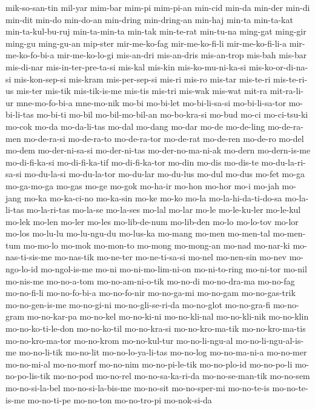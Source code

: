 {mik-so-san-tin mil-yar mim-bar mim-pi mim-pi-an min-cid min-da min-der
min-di min-dit min-do min-do-an min-dring min-dring-an min-haj min-ta
min-ta-kat min-ta-kul-bu-ruj min-ta-min-ta min-tak min-te-rat min-tu-na
ming-gat ming-gir ming-gu ming-gu-an mip-ster mir-me-ko-fag
mir-me-ko-fi-li mir-me-ko-fi-li-a mir-me-ko-fo-bi-a mir-me-ko-lo-gi
mis-an-dri mis-an-dris mis-an-trop mis-bah mis-bar mis-di-nar
mis-in-ter-pre-ta-si mis-kal mis-kin mis-ko-mu-ni-ka-si mis-ko-or-di-na-si
mis-kon-sep-si mis-kram mis-per-sep-si mis-ri mis-ro mis-tar mis-te-ri
mis-te-ri-us mis-ter mis-tik mis-tik-is-me mis-tis mis-tri mis-wak mis-wat
mit-ra mit-ra-li-ur mne-mo-fo-bi-a mne-mo-nik mo-bi mo-bi-let
mo-bi-li-sa-si mo-bi-li-sa-tor mo-bi-li-tas mo-bi-ti mo-bil
mo-bil-mo-bil-an mo-bo-kra-si mo-bud mo-ci mo-ci-tsu-ki mo-cok mo-da
mo-da-li-tas mo-dal mo-dang mo-dar mo-de mo-de-ling mo-de-ra-men
mo-de-ra-si mo-de-ra-to mo-de-ra-tor mo-de-rat mo-de-ren mo-de-ro mo-del
mo-dem mo-der-ni-sa-si mo-der-ni-tas mo-der-no-ma-ni-ak mo-dern
mo-dern-is-me mo-di-fi-ka-si mo-di-fi-ka-tif mo-di-fi-ka-tor mo-din mo-dis
mo-dis-te mo-du-la-ri-sa-si mo-du-la-si mo-du-la-tor mo-du-lar mo-du-lus
mo-dul mo-dus mo-fet mo-ga mo-ga-mo-ga mo-gas mo-ge mo-gok mo-ha-ir mo-hon
mo-hor mo-i mo-jah mo-jang mo-ka mo-ka-ci-no mo-ka-sin mo-ke mo-ko mo-la
mo-la-hi-da-ti-do-sa mo-la-li-tas mo-la-ri-tas mo-la-se mo-la-ses mo-lal
mo-lar mo-le mo-le-ku-ler mo-le-kul mo-lek mo-len mo-ler mo-les
mo-lib-de-num mo-lib-den mo-lo mo-lo-tov mo-lor mo-los mo-lu-lu
mo-lu-ngu-du mo-lus-ka mo-mang mo-men mo-men-tal mo-men-tum mo-mo-lo
mo-mok mo-mon-to mo-mong mo-mong-an mo-nad mo-nar-ki mo-nas-ti-sis-me
mo-nas-tik mo-ne-ter mo-ne-ti-sa-si mo-nel mo-nen-sin mo-nev mo-ngo-lo-id
mo-ngol-is-me mo-ni mo-ni-mo-lim-ni-on mo-ni-to-ring mo-ni-tor mo-nil
mo-nis-me mo-no-a-tom mo-no-am-ni-o-tik mo-no-di mo-no-dra-ma mo-no-fag
mo-no-fi-li mo-no-fo-bi-a mo-no-fo-nir mo-no-ga-mi mo-no-gam
mo-no-gas-trik mo-no-gen-is-me mo-no-gi-ni mo-no-gli-se-ri-da mo-no-glot
mo-no-gra-fi mo-no-gram mo-no-kar-pa mo-no-kel mo-no-ki-ni mo-no-kli-nal
mo-no-kli-nik mo-no-klin mo-no-ko-ti-le-don mo-no-ko-til mo-no-kra-si
mo-no-kro-ma-tik mo-no-kro-ma-tis mo-no-kro-ma-tor mo-no-krom
mo-no-kul-tur mo-no-li-ngu-al mo-no-li-ngu-al-is-me mo-no-li-tik mo-no-lit
mo-no-lo-ya-li-tas mo-no-log mo-no-ma-ni-a mo-no-mer mo-no-mi-al
mo-no-morf mo-no-nim mo-no-pi-le-tik mo-no-plo-id mo-no-po-li
mo-no-po-lis-tik mo-no-pod mo-no-rel mo-no-sa-ka-ri-da mo-no-se-man-tik
mo-no-sem mo-no-si-la-bel mo-no-si-la-bis-me mo-no-sit mo-no-sper-mi
mo-no-te-is mo-no-te-is-me mo-no-ti-pe mo-no-ton mo-no-tro-pi mo-nok-si-da
}

